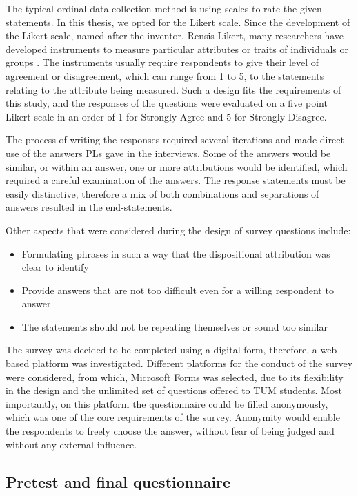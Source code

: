 The typical ordinal data collection method is using scales to rate the given statements. In this thesis, we opted for the Likert scale. Since the development of the Likert scale, named after the inventor, Rensis Likert, many researchers have developed instruments to measure particular attributes or traits of individuals or groups \cite{Allen2007}. The instruments usually require respondents to give their level of agreement or disagreement, which can range from 1 to 5, to the statements relating to the attribute being measured. Such a design fits the requirements of this study, and the responses of the questions were evaluated on a five point Likert scale in an order of 1 for Strongly Agree and 5 for Strongly Disagree. 

The process of writing the responses required several iterations and made direct use of the answers PLs gave in the interviews. Some of the answers would be similar, or within an answer, one or more attributions would be identified, which required a careful examination of the answers. The response statements must be easily distinctive, therefore a mix of both combinations and separations of answers resulted in the end-statements.

Other aspects that were considered during the design of survey questions include:
\begin{itemize} 
	 \item Formulating phrases in such a way that the dispositional attribution was clear to identify 
	 \item Provide answers that are not too difficult even for a willing respondent to answer
	 \item The statements should not be repeating themselves or sound too similar
\end{itemize}

The survey was decided to be completed using a digital form, therefore, a web-based platform was investigated. Different platforms for the conduct of the survey were considered, from which, Microsoft Forms was selected, due to its flexibility in the design and the unlimited set of questions offered to TUM students. Most importantly, on this platform the questionnaire could be filled anonymously, which was one of the core requirements of the survey. Anonymity would enable the respondents to freely choose the answer, without fear of being judged and without any external influence.

\subsection{Pretest and final questionnaire}

